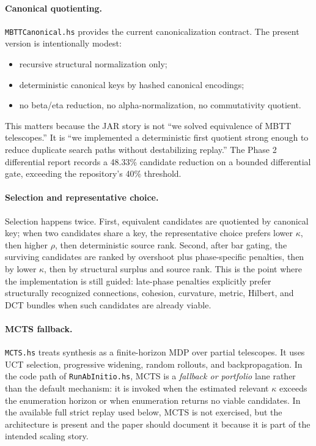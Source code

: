 \documentclass[11pt,a4paper]{article}
\begin{document}
\paragraph{Canonical quotienting.}
\texttt{MBTTCanonical.hs} provides the current canonicalization contract. The present version is intentionally modest:
\begin{itemize}[nosep]
  \item recursive structural normalization only;
  \item deterministic canonical keys by hashed canonical encodings;
  \item no beta/eta reduction, no alpha-normalization, no commutativity quotient.
\end{itemize}
This matters because the JAR story is not ``we solved equivalence of MBTT telescopes.'' It is ``we implemented a deterministic first quotient strong enough to reduce duplicate search paths without destabilizing replay.'' The Phase 2 differential report records a 48.33\% candidate reduction on a bounded differential gate, exceeding the repository's 40\% threshold.

\paragraph{Selection and representative choice.}
Selection happens twice. First, equivalent candidates are quotiented by canonical key; when two candidates share a key, the representative choice prefers lower $\kappa$, then higher $\rho$, then deterministic source rank. Second, after bar gating, the surviving candidates are ranked by overshoot plus phase-specific penalties, then by lower $\kappa$, then by structural surplus and source rank. This is the point where the implementation is still guided: late-phase penalties explicitly prefer structurally recognized connections, cohesion, curvature, metric, Hilbert, and DCT bundles when such candidates are already viable.

\paragraph{MCTS fallback.}
\texttt{MCTS.hs} treats synthesis as a finite-horizon MDP over partial telescopes. It uses UCT selection, progressive widening, random rollouts, and backpropagation. In the code path of \texttt{RunAbInitio.hs}, MCTS is a \emph{fallback or portfolio} lane rather than the default mechanism: it is invoked when the estimated relevant $\kappa$ exceeds the enumeration horizon or when enumeration returns no viable candidates. In the available full strict replay used below, MCTS is not exercised, but the architecture is present and the paper should document it because it is part of the intended scaling story.
\end{document}
